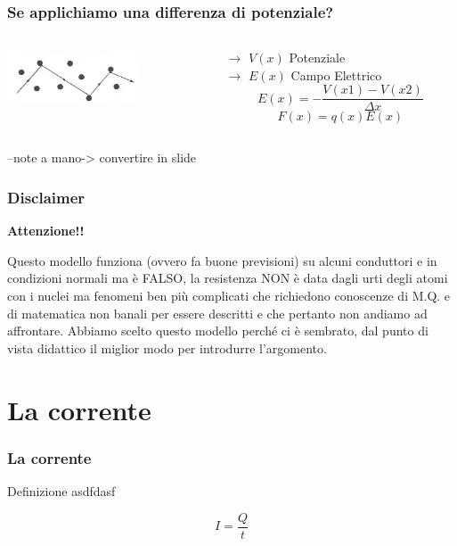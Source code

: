 		\begin{frame}[c]\frametitle{Se applichiamo una differenza di potenziale?}
			\begin{columns}
				\begin{column}{0.4\textwidth}
					\includegraphics[width=4cm]{./img/path.png}
				\end{column}
				\begin{column}{0.7\textwidth}

					$\longrightarrow$ $V(x)$ Potenziale\\
					$\longrightarrow$ $E(x)$ Campo Elettrico
					\[
					 E (x) = - \frac{V(x1)-V(x2)}{\Delta x}
					\]
					\[
					 F \left(x\right) = q \left(x\right) E(x)
					\]

				\end{column}
			\end{columns}
			--note a mano-> convertire in slide
		\end{frame}

		\begin{frame}[c]\frametitle{Disclaimer}
		    
		\begin{center}
			\color{red}\textbf{Attenzione!!}
		\end{center}
		Questo modello funziona (ovvero fa buone previsioni) su alcuni conduttori e in condizioni normali ma è FALSO, la resistenza NON è data dagli urti degli atomi con i nuclei ma fenomeni ben più complicati che richiedono conoscenze di M.Q. e di matematica non banali per essere descritti e che pertanto non andiamo ad affrontare. Abbiamo scelto questo modello perché ci è sembrato, dal punto di vista didattico il miglior modo per introdurre l'argomento.		
		\end{frame}

	\section{La corrente} %
	\label{sec:la_corrente}

	\begin{frame}[c]\frametitle{La corrente}
	    
		\begin{block}{Definizione}
			asdfdasf
		\end{block}
		\[
		I = \frac{Q}{t}
		\]
	
	\end{frame}
	
